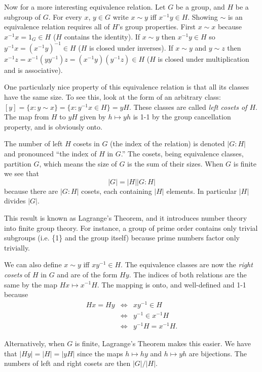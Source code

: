 \documentclass[letter]{article}
\begin{document}
Now for a more interesting equivalence relation. Let $G$ be a group, and $H$ be a subgroup of $G$. For every $x$, $y \in G$ write $x \sim y$ iff $x^{-1}y \in H$. Showing $\sim$ is an equivalence relation requires all of $H$'s group properties. First $x \sim x$ because $x^{-1}x = 1_G \in H$ ($H$ contains the identity). If $x \sim y$ then $x^{-1}y \in H$ so $y^{-1}x = (x^{-1}y)^{-1} \in H$ ($H$ is closed under inverses). If $x \sim y$ and $y \sim z$ then $x^{-1}z = x^{-1}(yy^{-1})z = (x^{-1}y)(y^{-1}z) \in H$ ($H$ is closed under multiplication and is associative).

One particularly nice property of this equivalence relation is that all its classes have the same size. To see this, look at the form of an arbitrary class: $\left[y\right] = \{x: y \sim x\} = \{x: y^{-1}x \in H\} = yH$. These classes are called \emph{left cosets of $H$}. The map from $H$ to $yH$ given by $h \mapsto yh$ is 1-1 by the group cancellation property, and is obviously onto.

The number of left $H$ cosets in $G$ (the index of the relation) is denoted $|G : H|$ and pronounced ``the index of $H$ in $G$.'' The cosets, being equivalence classes, partition $G$, which means the size of $G$ is the sum of their sizes.  When $G$ is finite we see that \[|G| = |H||G : H|\] because there are $|G : H|$ cosets, each containing $|H|$ elements. In particular $|H|$ divides $|G|$.

This result is known as Lagrange's Theorem, and it introduces number theory into finite group theory. For instance, a group of prime order contains only trivial subgroups (i.e. \{1\} and the group itself) because prime numbers factor only trivially.

We can also define $x \sim y$ iff $xy^{-1} \in H$. The equivalence classes are now the \emph{right cosets} of $H$ in $G$ and are of the form $Hy$.  The indices of both relations are the same by the map $Hx \mapsto x^{-1}H$. The mapping is onto, and well-defined and 1-1 because
\begin{eqnarray*}
Hx = Hy &\Longleftrightarrow& xy^{-1} \in H\\
        &\Longleftrightarrow& y^{-1} \in x^{-1}H\\
		&\Longleftrightarrow& y^{-1}H = x^{-1}H.
\end{eqnarray*}

Alternatively, when $G$ is finite, Lagrange's Theorem makes this easier. We have that $|Hy| = |H| = |yH|$ since the maps $h \mapsto hy$ and $h \mapsto yh$ are bijections. The numbers of left  and right cosets are then $|G|/|H|$.
\end{document}

